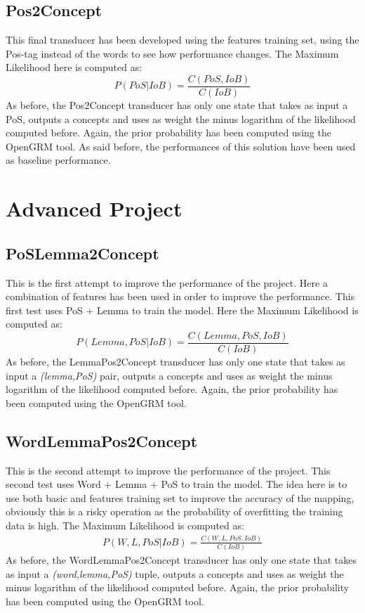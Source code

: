 \documentclass[11pt,a4paper]{article}
\begin{document}
\subsection{Pos2Concept}
    This final transducer has been developed using the features training set, using the Pos-tag instead of the words to see how performance changes. The Maximum Likelihood here is computed as:
\begin{equation}
    P(PoS| IoB) = \frac{C(PoS, IoB)}{C(IoB)}
\end{equation}
As before, the Pos2Concept transducer has only one state that takes as input a PoS, outputs a concepts and uses as weight the minus logarithm of the likelihood computed before. Again, the prior probability has been computed using the OpenGRM tool. As said before, the performances of this solution have been used as baseline performance.
\section{Advanced Project}
\subsection{PoSLemma2Concept}
This is the first attempt to improve the performance of the project. Here a combination of features has been used in order to improve the performance. This first test uses PoS + Lemma to train the model. Here the Maximum Likelihood is computed as:
\begin{equation}
    P(Lemma, PoS| IoB) = \frac{C(Lemma, PoS, IoB)}{C(IoB)}
\end{equation}
As before, the LemmaPos2Concept transducer has only one state that takes as input a \textit{(lemma,PoS)} pair, outputs a concepts and uses as weight the minus logarithm of the likelihood computed before. Again, the prior probability has been computed using the OpenGRM tool.
\subsection{WordLemmaPos2Concept}
This is the second attempt to improve the performance of the project. This second test uses Word + Lemma + PoS to train the model. The idea here is to use both basic and features training set to improve the accuracy of the mapping, obviously this is a risky operation as the probability of overfitting the training data is high. The Maximum Likelihood is computed as:
\begin{equation}
    \begin{split}
    P(W, L, PoS| IoB) =
                \frac{C(W, L, PoS, IoB)}{C(IoB)}
    \end{split}
    \end{equation}
As before, the WordLemmaPos2Concept transducer has only one state that takes as input a \textit{(word,lemma,PoS)} tuple, outputs a concepts and uses as weight the minus logarithm of the likelihood computed before. Again, the prior probability has been computed using the OpenGRM tool.
\end{document}
